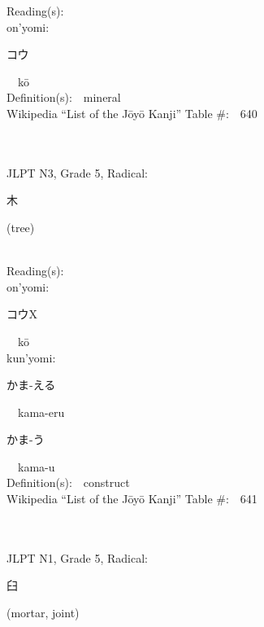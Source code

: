 \begin{multicols}{2}
Reading(s):\ \ \\
{\hspace*{1em}}on'yomi:\ \ \\
{\hspace*{2em}}{\begin{CJK}{UTF8}{min} コウ \end{CJK}}\ \ k\=o\ \ \\
Definition(s):\ \ mineral \\
Wikipedia ``List of the J\=oy\=o Kanji'' Table \#:\ \ 640 \\
\ \ \\
{\fontsize{34pt}{40pt}  }\ \ \\  %
{JLPT N3, Grade 5, Radical:\ \ {\begin{CJK}{UTF8}{min} 木 \end{CJK}} (tree) } \\
Reading(s):\ \ \\
{\hspace*{1em}}on'yomi:\ \ \\
{\hspace*{2em}}{\begin{CJK}{UTF8}{min} コウX \end{CJK}}\ \ k\=o\ \ \\
{\hspace*{1em}}kun'yomi:\ \ \\
{\hspace*{2em}}{\begin{CJK}{UTF8}{min} かま-える \end{CJK}}\ \ kama-eru\ \ \\
{\hspace*{2em}}{\begin{CJK}{UTF8}{min} かま-う \end{CJK}}\ \ kama-u\ \ \\
Definition(s):\ \ construct \\
Wikipedia ``List of the J\=oy\=o Kanji'' Table \#:\ \ 641 \\
\ \ \\
{\fontsize{34pt}{40pt}  }\ \ \\  %
{JLPT N1, Grade 5, Radical:\ \ {\begin{CJK}{UTF8}{min} 臼 \end{CJK}} (mortar, joint) } \\

\end{multicols}
